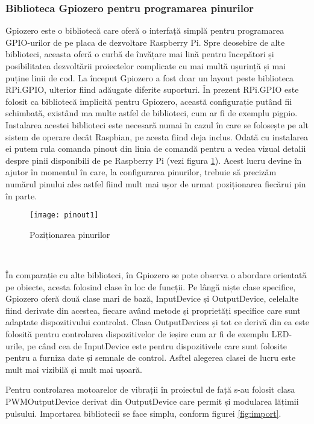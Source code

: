 \documentclass[../IoMusT.tex]{subfiles}
\begin{document}
\subsubsection{Biblioteca Gpiozero pentru programarea pinurilor}
Gpiozero este o bibliotecă care oferă o interfață simplă pentru programarea GPIO-urilor de pe placa de dezvoltare Raspberry Pi. Spre deosebire de alte biblioteci, aceasta oferă o curbă de învățare mai lină pentru începători și posibilitatea dezvoltării proiectelor complicate cu mai multă ușurință și mai puține linii de cod. La început Gpiozero a fost doar un layout peste biblioteca RPi.GPIO, ulterior fiind adăugate diferite suporturi. În prezent RPi.GPIO este folosit ca bibliotecă implicită pentru Gpiozero, această configurație putând fii schimbată, existând ma multe astfel de biblioteci, cum ar fi de exemplu pigpio. Instalarea acestei biblioteci este necesară numai în cazul în care se folosește pe alt sistem de operare decât Raspbian, pe acesta fiind deja inclus. Odată cu instalarea ei putem rula comanda pinout din linia de comandă pentru a vedea vizual detalii despre pinii disponibili de pe Raspberry Pi (vezi figura \ref{fig:pinout}). Acest lucru devine în ajutor în momentul în care, la configurarea pinurilor, trebuie să precizăm numărul pinului ales astfel fiind mult mai ușor de urmat poziționarea fiecărui pin în parte.
\begin{figure}[h]
\centering
\texttt{[image: pinout1]}
\caption{Poziționarea pinurilor}
\label{fig:pinout}
\end{figure}
\\
\par În comparație cu alte biblioteci, în Gpiozero se pote observa o abordare orientată pe obiecte, acesta folosind clase în loc de funcții. Pe lângă niște clase specifice, Gpiozero oferă două clase mari de bază, InputDevice și OutputDevice, celelalte fiind derivate din acestea, fiecare având metode și proprietăți specifice care sunt adaptate dispozitivului controlat. Clasa OutputDevices și tot ce derivă din ea este folosită pentru controlarea dispozitivelor de ieșire cum ar fi de exemplu LED-urile, pe când cea de InputDevice este pentru dispozitivele care sunt folosite pentru a furniza date și semnale de control. Asftel alegerea clasei de lucru este mult mai vizibilă și mult mai ușoară.
\\
\par Pentru controlarea motoarelor de vibrații în proiectul de față s-au folosit clasa PWMOutputDevice derivat din OutputDevice care permit și modularea lățimii pulsului. Importarea bibliotecii se face simplu, conform figurei \ref{fig:import}.
\end{document}
